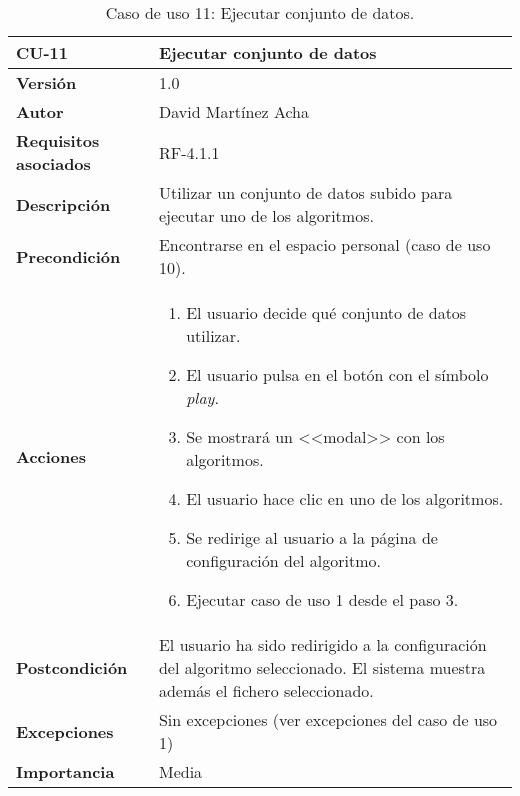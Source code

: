\begin{table}[p]
	\centering
	\begin{tabularx}{\linewidth}{ p{} p{} }
		\toprule
		\textbf{CU-11}    & \textbf{Ejecutar conjunto de datos}\\
		\toprule
		\textbf{Versión}              & 1.0    \\
		\textbf{Autor}                & David Martínez Acha \\
		\textbf{Requisitos asociados} & RF-4.1.1 \\
		\textbf{Descripción}          & Utilizar un conjunto de datos subido para ejecutar uno de los algoritmos. \\
		\textbf{Precondición}         & Encontrarse en el espacio personal (caso de uso 10). \\
		\textbf{Acciones}             &
		\begin{enumerate}
			\def\labelenumi{\arabic{enumi}.}
			\tightlist
			\item El usuario decide qué conjunto de datos utilizar.
			\item El usuario pulsa en el botón con el símbolo \textit{play}.
			\item Se mostrará un <<modal>> con los algoritmos.
			\item El usuario hace clic en uno de los algoritmos.
			\item Se redirige al usuario a la página de configuración del algoritmo.
			\item Ejecutar caso de uso 1 desde el paso 3.
		\end{enumerate}\\
		\textbf{Postcondición}        & El usuario ha sido redirigido a la configuración del algoritmo seleccionado. El sistema muestra además el fichero seleccionado. \\
		\textbf{Excepciones}          & Sin excepciones (ver excepciones del caso de uso 1)\\
		\textbf{Importancia}          & Media \\
		\bottomrule
	\end{tabularx}
	\caption{Caso de uso 11: Ejecutar conjunto de datos.}
\end{table}

